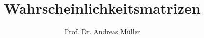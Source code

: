 %
%
%


\beamertemplatenavigationsymbolsempty
\title[W'keitsmatrizen]{Wahrscheinlichkeitsmatrizen}
\author[A.~Müller]{Prof. Dr. Andreas Müller}
\date[]{}

